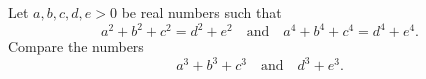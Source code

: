 Let \(a, b, c, d, e > 0\) be real numbers such that
\[a^{2}+b^{2}+c^{2}=d^{2}+e^{2} \quad \text{and} \quad a^{4}+b^{4}+c^{4}=d^{4}+e^{4}.\]
Compare the numbers \[a^{3}+b^{3}+c^{3} \quad \text{and} \quad d^{3}+e^{3}.\]